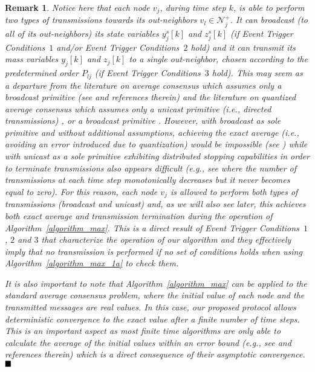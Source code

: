 \documentclass[twocolumn]{autart}    %
\newtheorem{remark}{Remark}
\begin{document}
\begin{remark}
Notice here that each node $v_j$, during time step $k$, is able to perform two types of transmissions towards its out-neighbors $v_l \in \mathcal{N}_j^+$. 
It can broadcast (to all of its out-neighbors) its state variables $y^s_j[k]$ and $z^s_j[k]$ (if Event Trigger Conditions~$1$ and/or Event Trigger Conditions~$2$ hold) and it can transmit its mass variables $y_j[k]$ and $z_j[k]$ to a single out-neighbor, chosen according to the predetermined order $P_{lj}$ (if Event Trigger Conditions~$3$ hold). 
This may seem as a departure from the literature on average consensus which assumes only a broadcast primitive (see \cite{2010:christoforos, 2011:Christoforos-Themis, 2011:Franceschelli} and references therein) and the literature on quantized average consensus which assumes only a unicast primitive (i.e., directed transmissions) \cite{2007:Basar, 2011:Cai_Ishii, 2020:Rikos_Quant_Cons, 2018:RikosHadj_CDC}, or a broadcast primitive \cite{2016:Chamie_Basar}. 
However, with broadcast as sole primitive and without additional assumptions, achieving the exact average (i.e., avoiding an error introduced due to quantization) would be impossible (see \cite{2015:Hendrickx_Tsitsiklis}) while with unicast as a sole primitive exhibiting distributed stopping capabilities in order to terminate transmissions also appears difficult (e.g., see \cite{2020:Rikos_Quant_Cons} where the number of  transmissions at each time step monotonically decreases but it never becomes equal to zero). 
For this reason, each node $v_j$ is allowed to perform both types of transmissions (broadcast and unicast) and, as we will also see later, this achieves both exact average and transmission termination during the operation of Algorithm~\ref{algorithm_max}. 
This is a direct result of Event Trigger Conditions~$1$, $2$ and $3$ that characterize the operation of our algorithm and they effectively imply that no transmission is performed if no set of conditions holds when using Algorithm~\ref{algorithm_max_1a} to check them. 

It is also important to note that Algorithm~\ref{algorithm_max} can be applied to the standard average consensus problem, where the initial value of each node and the transmitted messages are real values. 
In this case, our proposed protocol allows deterministic convergence to the {\em exact} value after a finite number of time steps. 
This is an important aspect as most finite time algorithms are only able to calculate the average of the initial values within an error bound (e.g., see \cite{2016:Manitara_Hadj} and references therein) which is a direct consequence of their asymptotic convergence. $\hfill \blacksquare$
\end{remark}
\end{document}
